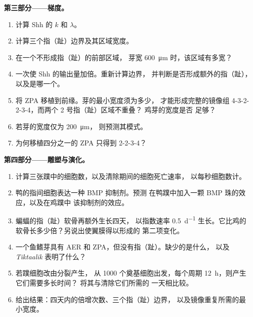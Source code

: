 \begin{problem}
\medskip
\noindent\textbf{第三部分——梯度。}
\begin{enumerate}[resume]
  \item 计算 Shh 的 $k$ 和 $\lambda$。
  \item 计算三个指（趾）边界及其区域宽度。
  \item 在一个不形成指（趾）的前部区域，
        芽宽 \qty{600}{\micro m} 时，该区域有多宽？
  \item 一次使 Shh 的输出量加倍。重新计算边界，
        并判断是否形成额外的指（趾），以及是哪一个。
  \item 将 ZPA 移植到前缘。芽的最小宽度须为多少，
        才能形成完整的镜像组 4-3-2-2-3-4，而两个 2 号指（趾）区域不重叠？
        鸡芽的宽度是否
        足够？
  \item 若芽的宽度仅为 \qty{200}{\micro m}，
        则预测其模式。
  \item 为何移植四分之一的 ZPA 只得到 2-2-3-4？
\end{enumerate}

\medskip
\noindent\textbf{第四部分——雕塑与演化。}
\begin{enumerate}[resume]
  \item 计算三张蹼中的细胞数，以及清除期间的细胞死亡速率，
        以每秒细胞数计。
  \item 鸭的指间细胞表达一种 BMP 抑制剂。预测
        在鸭蹼中加入一颗 BMP 珠的效应，以及在鸡蹼中
        该抑制剂的效应。
  \item 蝙蝠的指（趾）软骨再额外生长四天，
        以指数速率 \qty{0.5}{d^{-1}} 生长。它比鸡的
        软骨长多少倍？另说出使翼膜得以形成的
        第二项变化。
  \item 一个鱼鳍芽具有 AER 和 ZPA，但没有指（趾）。缺少的是什么，
        以及 \emph{Tiktaalik} 表明了什么？
  \item 若蹼细胞改由分裂产生，
        从 \num{1000} 个奠基细胞出发，每个周期 \qty{12}{h}，则产生它们需要多长时间？
        将其与清除它们所需的
        一天相比较。
  \item 给出结果：四天内的倍增次数、三个指（趾）边界，
        以及镜像重复所需的最小宽度。
\end{enumerate}
\end{problem}
